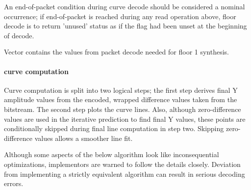 An end-of-packet condition during curve decode should be considered a
nominal occurrence; if end-of-packet is reached during any read
operation above, floor decode is to return 'unused' status as if the
\varname{[nonzero]} flag had been unset at the beginning of decode.


Vector \varname{[floor1_Y]} contains the values from packet decode
needed for floor 1 synthesis.



\paragraph{curve computation} \label{vorbis:spec:floor1-synth}

Curve computation is split into two logical steps; the first step
derives final Y amplitude values from the encoded, wrapped difference
values taken from the bitstream.  The second step plots the curve
lines.  Also, although zero-difference values are used in the
iterative prediction to find final Y values, these points are
conditionally skipped during final line computation in step two.
Skipping zero-difference values allows a smoother line fit.

Although some aspects of the below algorithm look like inconsequential
optimizations, implementors are warned to follow the details closely.
Deviation from implementing a strictly equivalent algorithm can result
in serious decoding errors.

